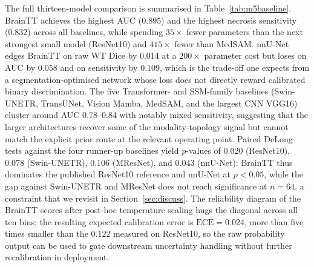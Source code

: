 \documentclass[11pt,a4paper]{article}
\begin{document}
The full thirteen-model comparison is summarised in Table~\ref{tab:m5baseline}. BrainTT achieves the highest AUC (0.895) and the highest necrosis sensitivity (0.832) across all baselines, while spending $35\times$ fewer parameters than the next strongest small model (ResNet10) and $415\times$ fewer than MedSAM. nnU-Net edges BrainTT on raw WT Dice by 0.014 at a $200\times$ parameter cost but loses on AUC by 0.058 and on sensitivity by 0.109, which is the trade-off one expects from a segmentation-optimised network whose loss does not directly reward calibrated binary discrimination. The five Transformer- and SSM-family baselines (Swin-UNETR, TransUNet, Vision Mamba, MedSAM, and the largest CNN VGG16) cluster around AUC 0.78--0.84 with notably mixed sensitivity, suggesting that the larger architectures recover some of the modality-topology signal but cannot match the explicit prior route at the relevant operating point. Paired DeLong tests against the four runner-up baselines yield $p$-values of $0.020$ (ResNet10), $0.078$ (Swin-UNETR), $0.106$ (MResNet), and $0.043$ (nnU-Net): BrainTT thus dominates the published ResNet10 reference and nnU-Net at $p<0.05$, while the gap against Swin-UNETR and MResNet does not reach significance at $n=64$, a constraint that we revisit in Section~\ref{sec:discuss}. The reliability diagram of the BrainTT scores after post-hoc temperature scaling hugs the diagonal across all ten bins; the resulting expected calibration error is $\text{ECE} = 0.024$, more than five times smaller than the $0.122$ measured on ResNet10, so the raw probability output can be used to gate downstream uncertainty handling without further recalibration in deployment.
\end{document}
